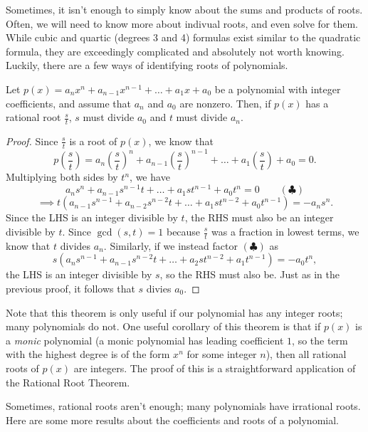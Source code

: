 \documentclass[12pt]{article}
\begin{document}
Sometimes, it isn't enough to simply know about the sums and products of roots. Often, we will need to know more about indivual roots, and even solve for them. While cubic and quartic (degrees 3 and 4) formulas exist similar to the quadratic formula, they are exceedingly complicated and absolutely not worth knowing. Luckily, there are a few ways of identifying roots of polynomials.
\begin{tcolorbox}[colback=blue!10!white, colframe=blue!50!black, title=The Rational Root Theorem]
    Let $p(x)=a_nx^n+a_{n-1}x^{n-1}+\dots+a_1x+a_0$ be a polynomial with integer coefficients, and assume that $a_n$ and $a_0$ are nonzero. Then, if $p(x)$ has a rational root $\frac{s}{t}$, $s$ must divide $a_0$ and $t$ must divide $a_n$. 
    \begin{proof}
        Since $\frac{s}{t}$ is a root of $p(x)$, we know that
        \[
            p\left(\frac{s}{t}\right)=a_n\left(\frac{s}{t}\right)^n+a_{n-1}\left(\frac{s}{t}\right)^{n-1}+\dots+a_1\left(\frac{s}{t}\right)+a_0=0. 
        \] Multiplying both sides by $t^n$, we have 
        \[
            a_ns^n+a_{n-1}s^{n-1}t+\dots+a_1st^{n-1}+a_0t^n=0\qquad ({\clubsuit})
        \]
        \[
            \implies t\left(a_{n-1}s^{n-1}+a_{n-2}s^{n-2}t+\dots+a_1st^{n-2}+a_0t^{n-1}\right)=-a_ns^n.
        \] Since the LHS is an integer divisible by $t$, the RHS must also be an integer divisible by $t$. Since $\gcd(s,t)=1$ because $\frac{s}{t}$ was a fraction in lowest terms, we know that $t$ divides $a_n$. 
        Similarly, if we instead factor $(\clubsuit)$ as 
        \[
            s\left(a_ns^{n-1}+a_{n-1}s^{n-2}t+\dots+a_2st^{n-2}+a_1t^{n-1}\right)=-a_0t^n,
        \] the LHS is an integer divisible by $s$, so the RHS must also be. Just as in the previous proof, it follows that $s$ divies $a_0$.
    \end{proof}
    Note that this theorem is only useful if our polynomial has any integer roots; many polynomials do not. 
    \tcblower
    One useful corollary of this theorem is that if $p(x)$ is a \textit{monic} polynomial (a monic polynomial has leading coefficient $1$, so the term with the highest degree is of the form $x^n$ for some integer $n$), then all rational roots of $p(x)$ are integers. The proof of this is a straightforward application of the Rational Root Theorem.
\end{tcolorbox}
Sometimes, rational roots aren't enough; many polynomials have irrational roots. Here are some more results about the coefficients and roots of a polynomial.
\end{document}
